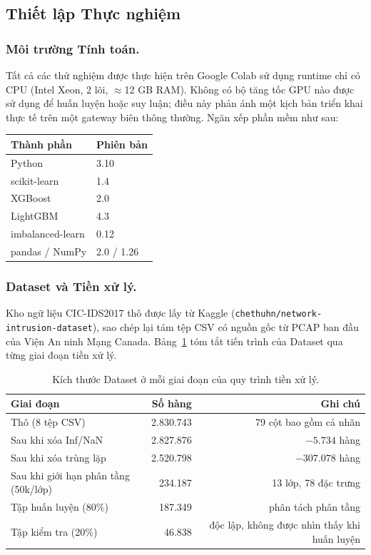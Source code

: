 \subsection{Thiết lập Thực nghiệm}
\label{sec:exp-setup}

\subsubsection*{Môi trường Tính toán.}
Tất cả các thử nghiệm được thực hiện trên Google Colab sử dụng runtime chỉ có CPU (Intel Xeon, 2 lõi, $\approx$12 GB RAM). Không có bộ tăng tốc GPU nào được sử dụng để huấn luyện hoặc suy luận; điều này phản ánh một kịch bản triển khai thực tế trên một gateway biên thông thường. Ngăn xếp phần mềm như sau:

\begin{center}
\begin{tabular}{ll}
\toprule
\textbf{Thành phần} & \textbf{Phiên bản}  \\
\midrule
Python             & 3.10  \\
scikit-learn       & 1.4  \\
XGBoost            & 2.0  \\
LightGBM           & 4.3  \\
imbalanced-learn   & 0.12  \\
pandas / NumPy     & 2.0 / 1.26  \\
\bottomrule
\end{tabular}
\end{center}

\subsubsection*{Dataset và Tiền xử lý.}
Kho ngữ liệu CIC-IDS2017 thô được lấy từ Kaggle
(\texttt{chethuhn/network-intrusion-dataset}), sao chép lại tám tệp CSV có nguồn gốc từ PCAP ban đầu của Viện An ninh Mạng Canada.
Bảng~\ref{tab:data-pipeline} tóm tắt tiến trình của Dataset qua từng giai đoạn tiền xử lý.

\begin{table}[h]
\centering
\caption{Kích thước Dataset ở mỗi giai đoạn của quy trình tiền xử lý.}
\label{tab:data-pipeline}
\begin{tabular}{lrr}
\toprule
\textbf{Giai đoạn} & \textbf{Số hàng} & \textbf{Ghi chú}  \\
\midrule
Thô (8 tệp CSV)                & 2.830.743 & 79 cột bao gồm cả nhãn  \\
Sau khi xóa Inf/NaN            & 2.827.876 & $-5{.}734$ hàng  \\
Sau khi xóa trùng lặp          & 2.520.798 & $-307{.}078$ hàng  \\
Sau khi giới hạn phân tầng (50k/lớp) & 234.187 & 13 lớp, 78 đặc trưng  \\
\midrule
Tập huấn luyện (80\%)          & 187.349   & phân tách phân tầng  \\
Tập kiểm tra (20\%)            & 46.838    & độc lập, không được nhìn thấy khi huấn luyện  \\
\bottomrule
\end{tabular}
\end{table}

